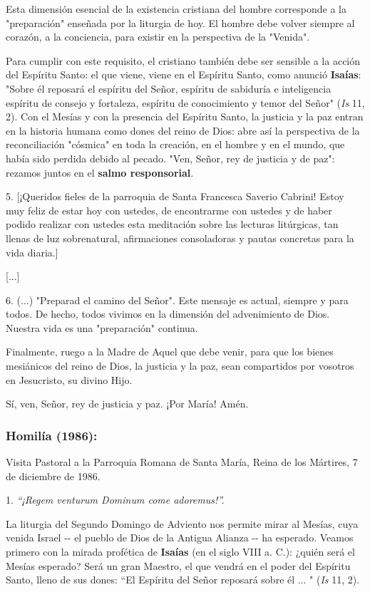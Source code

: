 \begin{body}
\begin{body}
Esta dimensión esencial de la existencia cristiana del hombre corresponde a la "preparación" enseñada por la liturgia de hoy. El hombre debe volver siempre al corazón, a la conciencia, para existir en la perspectiva de la "Venida".

Para cumplir con este requisito, el cristiano también debe ser sensible a la acción del Espíritu Santo: el que viene, viene en el Espíritu Santo, como anunció \textbf{Isaías}: "Sobre él reposará el espíritu del Señor, espíritu de sabiduría e inteligencia espíritu de consejo y fortaleza, espíritu de conocimiento y temor del Señor" (\emph{Is} 11, 2). Con el Mesías y con la presencia del Espíritu Santo, la justicia y la paz entran en la historia humana como dones del reino de Dios: abre así la perspectiva de la reconciliación "cósmica" en toda la creación, en el hombre y en el mundo, que había sido perdida debido al pecado. "Ven, Señor, rey de justicia y de paz": rezamos juntos en el \textbf{salmo responsorial}.

5. {[}¡Queridos fieles de la parroquia de Santa Francesca Saverio Cabrini! Estoy muy feliz de estar hoy con ustedes, de encontrarme con ustedes y de haber podido realizar con ustedes esta meditación sobre las lecturas litúrgicas, tan llenas de luz sobrenatural, afirmaciones consoladoras y pautas concretas para la vida diaria.{]}

{[}...{]}

6. (...) "Preparad el camino del Señor". Este mensaje es actual, siempre y para todos. De hecho, todos vivimos en la dimensión del advenimiento de Dios. Nuestra vida es una "preparación" continua.

Finalmente, ruego a la Madre de Aquel que debe venir, para que los bienes mesiánicos del reino de Dios, la justicia y la paz, sean compartidos por vosotros en Jesucristo, su divino Hijo.

Sí, ven, Señor, rey de justicia y paz. ¡Por María! Amén.
\end{body} 
	
\subsubsection{Homilía (1986): }

Visita Pastoral a la Parroquia Romana de Santa María, Reina de los Mártires, 7 de diciembre de 1986.

\begin{body} 
1. \emph{``¡Regem venturum Dominum come adoremus!''.}

La liturgia del Segundo Domingo de Adviento nos permite mirar al Mesías, cuya venida Israel -\/- el pueblo de Dios de la Antigua Alianza -\/- ha esperado. Veamos primero con la mirada profética de \textbf{Isaías} (en el siglo VIII a. C.): ¿quién será el Mesías esperado? Será un gran Maestro, el que vendrá en el poder del Espíritu Santo, lleno de sus dones: ``El Espíritu del Señor reposará sobre él ... " (\emph{Is} 11, 2).


\end{body}
\end{body}
